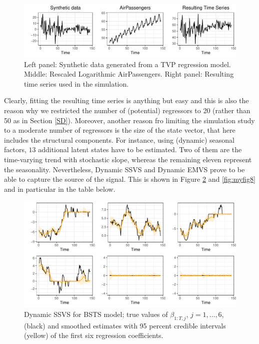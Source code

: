 \documentclass[
  12pt,
]{book}
\theoremstyle{break}
\theoremstyle{nonumberplain}
\begin{document}
\begin{figure}[H]

{\centering \includegraphics{Dynamic-Shrinkage-in-Bayesian-Structural-Time-Series-and-Vector-Autoregressive-Models_files/figure-latex/myfig6-1} 

}

\caption{Left panel: Synthetic data generated from a TVP regression model. Middle: Rescaled Logarithmic AirPassengers. Right panel: Resulting time series used in the simulation.}\label{fig:myfig6}
\end{figure}

Clearly, fitting the resulting time series is anything but easy and this
is also the reason why we restricted the number of (potential)
regressors to 20 (rather than 50 as in Section \ref{SD}). Moreover,
another reason fro limiting the simulation study to a moderate number of
regressors is the size of the state vector, that here includes the
structural components. For instance, using (dynamic) seasonal factors,
\(13\) additional latent states have to be estimated. Two of them are
the time-varying trend with stochastic slope, whereas the remaining
eleven represent the seasonality. Nevertheless, Dynamic SSVS and Dynamic
EMVS prove to be able to capture the source of the signal. This is shown
in Figure \ref{fig:myfig7} and \ref{fig:myfig8} and in particular in the
table below.

\begin{figure}[ht]

{\centering \includegraphics{Dynamic-Shrinkage-in-Bayesian-Structural-Time-Series-and-Vector-Autoregressive-Models_files/figure-latex/myfig7-1} 

}

\caption{Dynamic SSVS for BSTS model; true values of $\beta_{1:T, j}$, $j=1, \ldots, 6$, (black) and smoothed estimates with 95 percent credible intervals (yellow) of the first six regression coefficients.}\label{fig:myfig7}
\end{figure}
\end{document}
